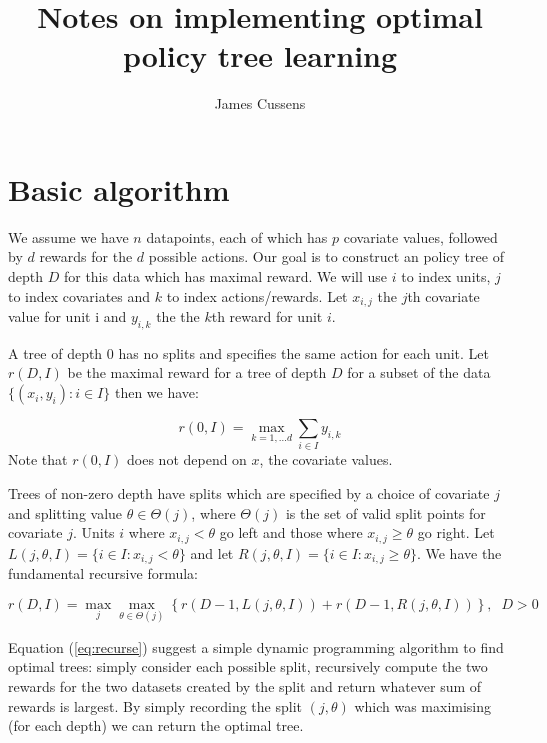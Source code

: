 \documentclass{article}
\title{Notes on implementing optimal policy tree learning}
\author{James Cussens}
\newcommand{\splitval}{\ensuremath{\theta}}
\newcommand{\splitvals}{\ensuremath{\Theta}}
\newcommand{\depth}{\ensuremath{D}}
\begin{document}
\maketitle

\section{Basic algorithm}
\label{sec:basics}



We assume we have $n$ datapoints, each of which has $p$ covariate
values, followed by $d$ rewards for the $d$ possible actions. Our goal
is to construct an policy tree of depth $\depth$ for this data which has
maximal reward. We will use $i$ to index units, $j$ to index
covariates and $k$ to index actions/rewards. Let $x_{i,j}$ the $j$th
covariate value for unit i and $y_{i,k}$ the the $k$th reward for unit $i$.

A tree of depth 0 has no splits and specifies the same action for each
unit. Let $r(\depth,I)$ be the maximal reward for a tree of depth
$\depth$ for a subset of the data $\{(x_{i},y_{i}): i \in I\}$ then we
have:

\begin{equation}
  \label{eq:rewardt0}
  r(0,I) = \max_{k=1,\dots d} \sum_{i \in I} y_{i,k}
\end{equation}
Note that $r(0,I)$ does not depend on $x$, the covariate values.

Trees of non-zero depth have splits which are specified by a choice of
covariate $j$ and splitting value $\splitval \in \splitvals(j)$, where
$\splitvals(j)$ is the set of valid split points for covariate
$j$. Units $i$ where $x_{i,j} < \splitval$ go left and those where
$x_{i,j} \geq \splitval$ go right. Let
$L(j,\splitval,I) = \{i \in I :x_{i,j} < \splitval\}$ and let
$R(j,\splitval,I) = \{i \in I :x_{i,j} \geq \splitval\}$. We have the
fundamental recursive formula:

\begin{equation}
  \label{eq:recurse}
  r(\depth,I) = \max_{j} \max_{\splitval \in \splitvals(j)} \left\{ r(\depth-1,L(j,\splitval,I))
  + r(\depth-1,R(j,\splitval,I))\right\}, \;\; \depth > 0 
\end{equation}

Equation (\ref{eq:recurse}) suggest a simple dynamic programming
algorithm to find optimal trees: simply consider each possible split,
recursively compute the two rewards for the two datasets created by the
split and return whatever sum of rewards is largest. By simply
recording the split $(j,\splitval)$ which was maximising (for each
depth) we can return the optimal tree.
\end{document}
